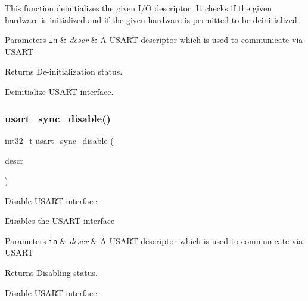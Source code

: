 This function deinitializes the given I/O descriptor. It checks if the given hardware is initialized and if the given hardware is permitted to be deinitialized.


\begin{DoxyParams}[1]{Parameters}
\mbox{\tt in}  & {\em descr} & A U\+S\+A\+RT descriptor which is used to communicate via U\+S\+A\+RT\\
\hline
\end{DoxyParams}
\begin{DoxyReturn}{Returns}
De-\/initialization status.
\end{DoxyReturn}
Deinitialize U\+S\+A\+RT interface. \mbox{\label{group__doc__driver__hal__usart__sync_ga76abe691b76e4b95b4e3a7d5bc79b026}} 
\subsubsection{\texorpdfstring{usart\+\_\+sync\+\_\+disable()}{usart\_sync\_disable()}}
{\footnotesize\ttfamily int32\+\_\+t usart\+\_\+sync\+\_\+disable (\begin{DoxyParamCaption}\item[{struct \hyperlink{structusart__sync__descriptor}{usart\+\_\+sync\+\_\+descriptor} $\ast$const}]{descr }\end{DoxyParamCaption})}



Disable U\+S\+A\+RT interface. 

Disables the U\+S\+A\+RT interface


\begin{DoxyParams}[1]{Parameters}
\mbox{\tt in}  & {\em descr} & A U\+S\+A\+RT descriptor which is used to communicate via U\+S\+A\+RT\\
\hline
\end{DoxyParams}
\begin{DoxyReturn}{Returns}
Disabling status.
\end{DoxyReturn}
Disable U\+S\+A\+RT interface. \mbox{\label{group__doc__driver__hal__usart__sync_ga351aa9c8c94b4e8b0eb5efb1ecd74a82}} 
